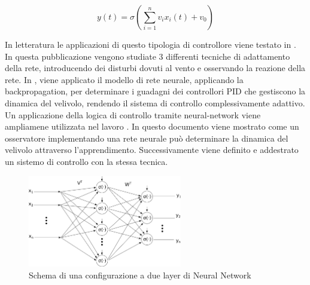 \begin{equation}\label{eq:SistemaQuadrirotore_NN}
	y(t) = \sigma\left(\sum_{i=1}^{n} v_i x_i(t) + v_0\right)
\end{equation}

In letteratura le applicazioni di questo tipologia di controllore viene testato in \cite{4564736}. In questa pubblicazione vengono studiate 3 differenti tecniche di adattamento della rete, introducendo dei disturbi dovuti al vento e osservando la reazione della rete. In \cite{8287305}, viene applicato il modello di rete neurale, applicando la backpropagation, per determinare i guadagni dei controllori PID che gestiscono la dinamica del velivolo, rendendo il sistema di controllo complessivamente adattivo. Un applicazione della logica di controllo tramite neural-network viene ampliamene utilizzata nel lavoro \cite{5345702}. In questo documento viene mostrato come un osservatore implementando una rete neurale può determinare la dinamica del velivolo attraverso l'apprendimento. Successivamente viene definito e addestrato un sistemo di controllo con la stessa tecnica.

\begin{figure}
	\centering
	\includegraphics[width=0.6\textwidth]{SistemaQuadrirotore/Figure/NN_Struttura}
	\caption{Schema di una configurazione a due layer di Neural Network}
	\label{fig:NN}
\end{figure}

